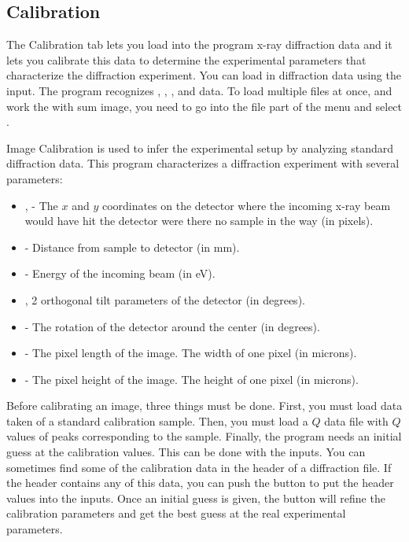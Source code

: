 \subsection{Calibration}

The Calibration tab lets you load into the program 
x-ray diffraction data and it lets you calibrate 
this data to determine the experimental parameters 
that characterize the diffraction experiment. You 
can load in diffraction data using the 
 input. The program 
recognizes , , 
, and  data. To load 
multiple files at once, and work the with sum image, 
you need to go into the file part of the menu and 
select .

Image Calibration is used to infer the experimental 
setup by analyzing standard diffraction data. This 
program characterizes a diffraction experiment 
with several parameters:
\index{$\alpha$}
\index{$\beta$}
\begin{itemize}
    \item {},  - The $x$ 
and $y$ coordinates on the detector where the incoming 
x-ray beam would have hit the detector were there 
no sample in the way (in pixels).
    \item {} - Distance from sample to 
        detector (in mm).
    \item {} - Energy of the incoming beam (in eV).
    \item {},  2 orthogonal tilt 
        parameters of the detector (in degrees).
    \item {} - The rotation of the detector 
        around the center (in degrees).
    \item {} - The pixel length of the image. 
        The width of one pixel (in microns).
    \item {} - The pixel height of the image. 
        The height of one pixel (in microns).
\end{itemize}

Before calibrating an image, three things must be done. 
First, you must load data taken of a standard calibration 
sample. Then, you must load a $Q$ data file with $Q$ values 
of peaks corresponding to the sample. Finally, the program 
needs an initial guess at the calibration values. This can 
be done with the  inputs. You can sometimes 
find some of the calibration data in the header of a 
diffraction file. If the header contains any of this data, 
you can push the  button to put the 
header values into the inputs. Once an initial guess is 
given, the  button will refine the calibration 
parameters and get the best guess at the real experimental 
parameters.

